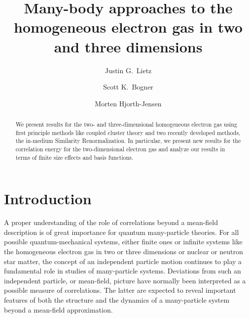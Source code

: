 \documentclass[aps,twocolumn,showpacs,floatfix,nofootinbib,preprintnumbers,superscriptaddress,amsmath,amssymb]{revtex4-1}
\begin{document}
\title{Many-body approaches to the homogeneous electron gas in two and three dimensions} 


\author{Justin G.~Lietz}

\author{Scott K.~Bogner}

\author{Morten Hjorth-Jensen} 

\begin{abstract} 
We present results for the two- and three-dimensional homogeneous
electron gas using first principle methods like coupled cluster
theory and two recently developed methods, the in-medium Similarity Renormalization. In particular, we present
new results for the correlation energy for the two-dimensional
electron gas and analyze our results in terms of finite size effects and basis functions.
\end{abstract}


\maketitle

\section{Introduction}
A proper understanding of the role of correlations beyond a mean-field
description is of great importance for quantum many-particle
theories. For all possible quantum-mechanical systems, either finite
ones or infinite systems like the homogeneous electron gas in two or
three dimensions or nuclear or neutron star matter, the concept of an
independent particle motion continues to play a fundamental role in
studies of many-particle systems.  Deviations from such an independent
particle, or mean-field, picture have normally been interpreted as a
possible measure of correlations.  The latter are expected to reveal
important features of both the structure and the dynamics of a
many-particle system beyond a mean-field approximation.
\end{document}
